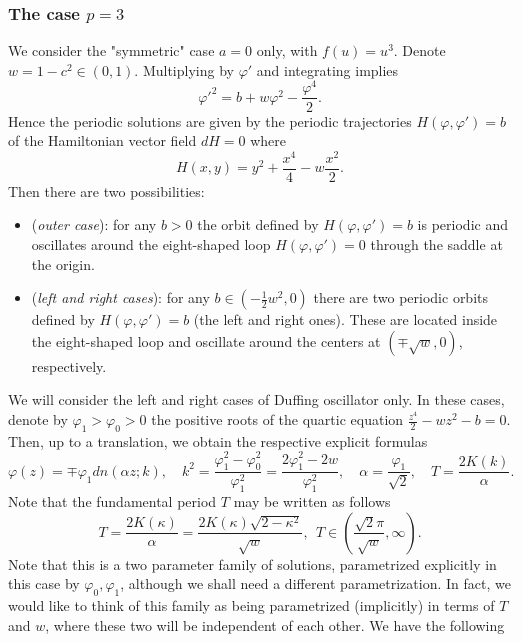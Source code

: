 \documentclass[final,11pt,leqno]{amsart}
\begin{document}
\subsubsection{The case $p=3$}
We   consider  the "symmetric" case $a=0$ only, with $f(u)=u^3$.
Denote $w=1-c^2\in (0,1)$.
Multiplying by ${\varphi}'$ and integrating implies
       \begin{equation}\label{mkdv1}
         \varphi'^{2}=b+w\varphi^2-{\frac{\varphi^4}{2}}.
       \end{equation}
       Hence the periodic solutions are given by the periodic
trajectories $H(\varphi,\varphi')=b$ of the Hamiltonian vector
field $dH=0$ where
$$
H(x,y)=y^2+{\frac{x^4}{4}}-w\frac{x^2}{2}.
$$
 Then
there are two possibilities:
\begin{itemize}
\item({\it outer case}): for any $b>0$ the
orbit defined by $H(\varphi,\varphi')=b$ is periodic and
oscillates around the eight-shaped loop $H(\varphi,\varphi')=0$
through the saddle at the origin.

\item({\it left and right cases}): for any
$b\in(-\frac12w^2,0)$ there are two periodic orbits defined by
$H(\varphi,\varphi')=b$ (the left and right ones). These are
located inside the eight-shaped loop and oscillate around the
centers at $(\mp\sqrt{w},0)$, respectively.
\end{itemize}
We will consider the left and right cases
of Duffing oscillator only. In these cases,   denote by
$\varphi_1>\varphi_0>0$ the positive roots of the quartic equation
$\frac{z^4}{2}-wz^2-b=0$. Then, up to a translation,
we obtain the respective explicit formulas
\begin{equation}\label{mkdv2}
\varphi(z)=\mp \varphi_1 dn(\alpha z; k),\quad
k^2=\frac{\varphi_1^2-\varphi_0^2}{\varphi_1^2}
=\frac{2\varphi_1^2-2w}{\varphi_1^2}, \quad
\alpha={\frac{\varphi_1}{\sqrt{2}}}, \quad T=\frac{2K(k)}{\alpha}.
\end{equation}
Note that the fundamental period $T$  may be written as follows
\begin{equation}
\label{z:200}
T={\frac{{2K({\kappa})}}{\alpha}}={\frac{{2 K({\kappa}) \sqrt{2-{\kappa}^2}}}{{\sqrt{w}}}},\ \  T\in
\left({\frac{{\sqrt{2} \pi}}{{\sqrt{w}}}}, \infty\right).
\end{equation}
Note that this is a two parameter family of solutions, parametrized explicitly in this case by ${\varphi}_0, {\varphi}_1$, although we shall need a different
parametrization. In fact,
we would like to think of this family as being parametrized (implicitly) in terms of $T$ and $w$, where these two will be independent of each other.
We have the following
\end{document}
